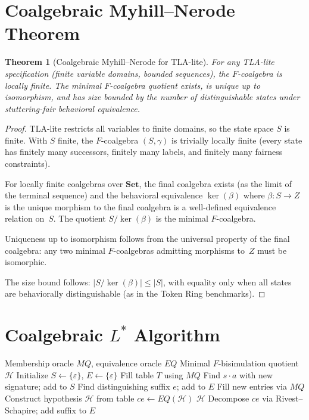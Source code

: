 \documentclass[11pt]{article}
\newtheorem{theorem}{Theorem}
\newcommand{\Set}{\mathbf{Set}}
\begin{document}
\section{Coalgebraic Myhill--Nerode Theorem}
\label{app:myhill-nerode}

\begin{theorem}[Coalgebraic Myhill--Nerode for TLA-lite]
\label{thm:mn-app}
For any TLA-lite specification (finite variable domains, bounded sequences),
the $F$-coalgebra is locally finite.
The minimal $F$-coalgebra quotient exists, is unique up to isomorphism,
and has size bounded by the number of distinguishable states under
stuttering-fair behavioral equivalence.
\end{theorem}

\begin{proof}
TLA-lite restricts all variables to finite domains, so the state space
$S$ is finite.
With $S$ finite, the $F$-coalgebra $(S, \gamma)$ is trivially locally
finite (every state has finitely many successors, finitely many labels,
and finitely many fairness constraints).

For locally finite coalgebras over $\Set$, the final coalgebra exists
(as the limit of the terminal sequence) and the behavioral equivalence
$\ker(\beta)$ where $\beta : S \to Z$ is the unique morphism to the final
coalgebra is a well-defined equivalence relation on~$S$.
The quotient $S/\ker(\beta)$ is the minimal $F$-coalgebra.

Uniqueness up to isomorphism follows from the universal property of the
final coalgebra: any two minimal $F$-coalgebras admitting morphisms to~$Z$
must be isomorphic.

The size bound follows: $|S/\ker(\beta)| \leq |S|$, with equality only
when all states are behaviorally distinguishable (as in the Token Ring
benchmarks).
\end{proof}


\section{Coalgebraic $L^*$ Algorithm}
\label{app:lstar}

\begin{algorithm}[h]
\caption{Coalgebraic $L^*$ for Functor $F$}
\label{alg:lstar}
\begin{algorithmic}[1]
\Require Membership oracle $\mathit{MQ}$, equivalence oracle $\mathit{EQ}$
\Ensure Minimal $F$-bisimulation quotient $\mathcal{H}$
\State Initialize $S \gets \{\varepsilon\}$, $E \gets \{\varepsilon\}$
\State Fill table $T$ using $\mathit{MQ}$
\Loop
      \State Find $s \cdot a$ with new signature; add to $S$
    \EndIf
      \State Find distinguishing suffix $e$; add to $E$
    \EndIf
    \State Fill new entries via $\mathit{MQ}$
  \EndWhile
  \State Construct hypothesis $\mathcal{H}$ from table
  \State $\mathit{ce} \gets \mathit{EQ}(\mathcal{H})$
    \State \Return $\mathcal{H}$
  \EndIf
  \State Decompose $\mathit{ce}$ via Rivest--Schapire; add suffix to $E$
\EndLoop
\end{algorithmic}
\end{algorithm}
\end{document}

